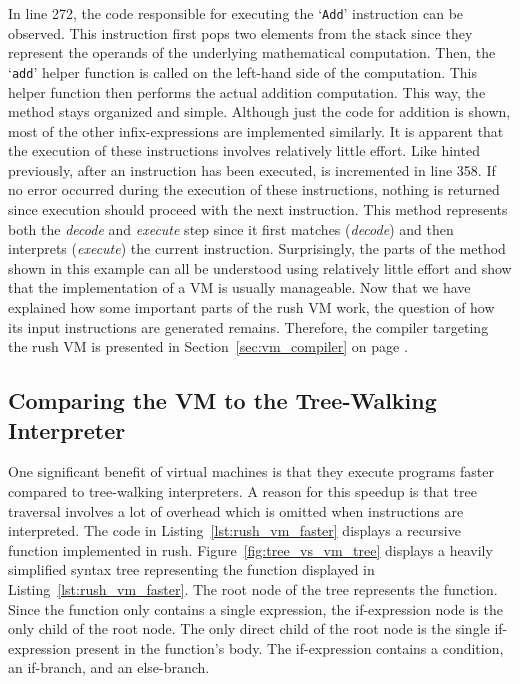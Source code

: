 In line 272, the code responsible for executing the `\texttt{Add}' instruction can be observed.
This instruction first pops two elements from the stack since they represent the operands of the underlying mathematical computation.
Then, the `\texttt{add}' helper function is called on the left-hand side of the computation.
This helper function then performs the actual addition computation.
This way, the  method stays organized and simple.
Although just the code for addition is shown, most of the other infix-expressions are implemented similarly.
It is apparent that the execution of these instructions involves relatively little effort.
Like hinted previously, after an instruction has been executed,  is incremented in line 358.
If no error occurred during the execution of these instructions, nothing is returned since execution should proceed with the next instruction.
This method represents both the \emph{decode} and \emph{execute} step since it first matches (\emph{decode}) and then interprets (\emph{execute}) the current instruction.
Surprisingly, the parts of the method shown in this example can all be understood using relatively little effort and show that the implementation of a VM is usually manageable.
Now that we have explained how some important parts of the rush VM work, the question of how its input instructions are generated remains.
Therefore, the compiler targeting the rush VM is presented in Section~\ref{sec:vm_compiler} on page \pageref{sec:vm_compiler}.

\subsection{Comparing the VM to the Tree-Walking Interpreter}

One significant benefit of virtual machines is that they execute programs faster compared to tree-walking interpreters.
A reason for this speedup is that tree traversal involves a lot of overhead which is omitted when instructions are interpreted.
The code in Listing~\ref{lst:rush_vm_faster} displays a recursive function implemented in rush.
Figure~\ref{fig:tree_vs_vm_tree} displays a heavily simplified syntax tree representing the function displayed in Listing~\ref{lst:rush_vm_faster}.
The root node of the tree represents the  function.
Since the function only contains a single expression, the if-expression node is the only child of the root node.
The only direct child of the root node is the single if-expression present in the function's body.
The if-expression contains a condition, an if-branch, and an else-branch.

